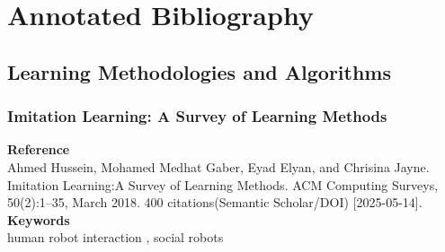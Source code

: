 \documentclass[report.tex]{subfiles}
\begin{document}
\chapter{Annotated Bibliography}
\section{Learning Methodologies and Algorithms}
\subsection{Imitation Learning: A Survey of Learning Methods} 

\noindent\textbf{Reference} \\
\cite{hussein_imitation_2018}Ahmed Hussein, Mohamed Medhat Gaber, Eyad Elyan, and Chrisina Jayne. Imitation Learning:A Survey of Learning Methods. ACM Computing Surveys, 50(2):1–35, March 2018. 400 citations(Semantic Scholar/DOI) [2025-05-14].
\\


\noindent\textbf{Keywords} \\
human robot interaction , social robots 
   \\
\end{document}

